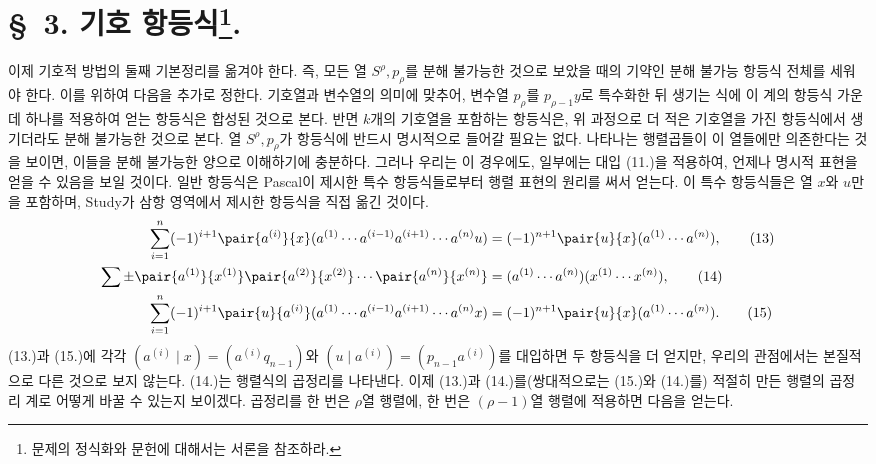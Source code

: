 
\section*{\S\ 3. 기호 항등식\footnote{문제의 정식화와 문헌에 대해서는 서론을 참조하라.}.}
이제 기호적 방법의 둘째 기본정리를 옮겨야 한다. 즉, 모든 열 $S^\rho,p_\rho$를 분해 불가능한 것으로 보았을 때의 기약인 분해 불가능 항등식 전체를 세워야 한다. 이를 위하여 다음을 추가로 정한다. 기호열과 변수열의 의미에 맞추어, 변수열 $p_\rho$를 $p_{\rho-1}y$로 특수화한 뒤 생기는 식에 이 계의 항등식 가운데 하나를 적용하여 얻는 항등식은 합성된 것으로 본다. 반면 $k$개의 기호열을 포함하는 항등식은, 위 과정으로 더 적은 기호열을 가진 항등식에서 생기더라도 분해 불가능한 것으로 본다. 열 $S^\rho,p_\rho$가 항등식에 반드시 명시적으로 들어갈 필요는 없다. 나타나는 행렬곱들이 이 열들에만 의존한다는 것을 보이면, 이들을 분해 불가능한 양으로 이해하기에 충분하다. 그러나 우리는 이 경우에도, 일부에는 대입 (11.)을 적용하여, 언제나 명시적 표현을 얻을 수 있음을 보일 것이다. 일반 항등식은 Pascal이 제시한 특수 항등식들로부터 행렬 표현의 원리를 써서 얻는다. 이 특수 항등식들은 열 $x$와 $u$만을 포함하며, Study가 삼항 영역에서 제시한 항등식을 직접 옮긴 것이다.
\begin{align}
\sum_{i=1}^n(-1)^{i+1}\pair{a^{(i)}}{x}(a^{(1)}\cdots a^{(i-1)}a^{(i+1)}\cdots a^{(n)}u)&=(-1)^{n+1}\pair{u}{x}(a^{(1)}\cdots a^{(n)}),\tag{13}\\
\sum\pm\pair{a^{(1)}}{x^{(1)}}\pair{a^{(2)}}{x^{(2)}}\cdots\pair{a^{(n)}}{x^{(n)}}&=(a^{(1)}\cdots a^{(n)})(x^{(1)}\cdots x^{(n)}),\tag{14}\\
\sum_{i=1}^n(-1)^{i+1}\pair{u}{a^{(i)}}(a^{(1)}\cdots a^{(i-1)}a^{(i+1)}\cdots a^{(n)}x)&=(-1)^{n+1}\pair{u}{x}(a^{(1)}\cdots a^{(n)}).\tag{15}
\end{align}
(13.)과 (15.)에 각각 $(a^{(i)}\mid x)=(a^{(i)}q_{n-1})$와 $(u\mid a^{(i)})=(p_{n-1}a^{(i)})$를 대입하면 두 항등식을 더 얻지만, 우리의 관점에서는 본질적으로 다른 것으로 보지 않는다. (14.)는 행렬식의 곱정리를 나타낸다. 이제 (13.)과 (14.)를(쌍대적으로는 (15.)와 (14.)를) 적절히 만든 행렬의 곱정리 계로 어떻게 바꿀 수 있는지 보이겠다. 곱정리를 한 번은 $\rho$열 행렬에, 한 번은 $(\rho-1)$열 행렬에 적용하면 다음을 얻는다.
